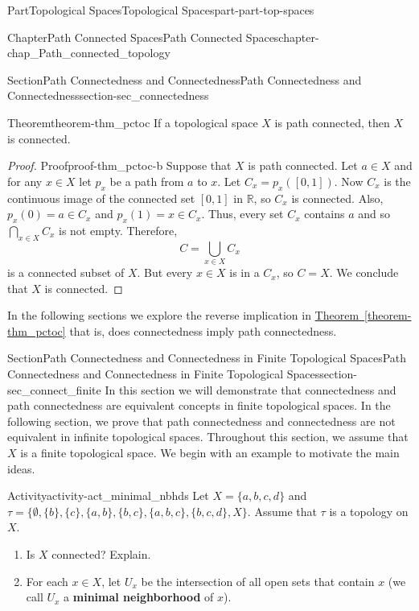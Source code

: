 \documentclass[oneside,10pt,]{book}
\newcommand{\xreffont}{\relax}
\newcommand{\terminology}[1]{\textbf{#1}}
\numberwithin{equation}{chapter}
\newcommand{\R}{\mathbb{R}}
\begin{document}
\begin{partptx}{Part}{Topological Spaces}{}{Topological Spaces}{}{}{part-part-top-spaces}
\begin{chapterptx}{Chapter}{Path Connected Spaces}{}{Path Connected Spaces}{}{}{chapter-chap_Path_connected_topology}
\begin{sectionptx}{Section}{Path Connectedness and Connectedness}{}{Path Connectedness and Connectedness}{}{}{section-sec_connectedness}
\begin{theorem}{Theorem}{}{}{theorem-thm_pctoc}
If a topological space \(X\) is path connected, then \(X\) is connected.%
\end{theorem}
\begin{proof}{Proof}{}{proof-thm_pctoc-b}
Suppose that \(X\) is path connected. Let \(a \in X\) and for any \(x \in X\) let \(p_x\) be a path from \(a\) to \(x\). Let \(C_x = p_x([0,1])\). Now \(C_x\) is the continuous image of the connected set \([0,1]\) in \(\R\), so \(C_x\) is connected. Also, \(p_x(0) = a \in C_x\) and \(p_x(1) = x \in C_x\). Thus, every set \(C_x\) contains \(a\) and so \(\bigcap_{x \in X} C_x\) is not empty. Therefore,%
\begin{equation*}
C = \bigcup_{x \in X} C_x
\end{equation*}
is a connected subset of \(X\). But every \(x \in X\) is in a \(C_x\), so \(C = X\). We conclude that \(X\) is connected.%
\end{proof}
In the following sections we explore the reverse implication in \hyperref[theorem-thm_pctoc]{Theorem~{\xreffont\ref{theorem-thm_pctoc}}} \textemdash{} that is, does connectedness imply path connectedness.%
\end{sectionptx}
%
%
\typeout{************************************************}
\typeout{************************************************}
%
\begin{sectionptx}{Section}{Path Connectedness and Connectedness in Finite Topological Spaces}{}{Path Connectedness and Connectedness in Finite Topological Spaces}{}{}{section-sec_connect_finite}
In this section we will demonstrate that connectedness and path connectedness are equivalent concepts in finite topological spaces. In the following section, we prove that path connectedness and connectedness are not equivalent in infinite topological spaces. Throughout this section, we assume that \(X\) is a finite topological space. We begin with an example to motivate the main ideas.%
\begin{activity}{Activity}{}{activity-act_minimal_nbhds}%
Let \(X = \{a,b,c,d\}\) and \(\tau = \{\emptyset, \{b\}, \{c\}, \{a,b\}, \{b,c\}, \{a,b,c\}, \{b,c,d\}, X\}\). Assume that \(\tau\) is a topology on \(X\).%
\begin{enumerate}[font=\bfseries,label=(\alph*),ref=\alph*]%
\item{}Is \(X\) connected? Explain.%
\item{}For each \(x \in X\), let \(U_x\) be the intersection of all open sets that contain \(x\) (we call \(U_x\) a \terminology{minimal neighborhood} of \(x\)).%

\end{enumerate}
\end{activity}
\end{sectionptx}
\end{chapterptx}
\end{partptx}
\end{document}
